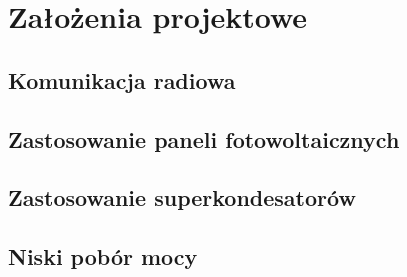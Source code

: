\chapter{Założenia projektowe}
\section{Komunikacja radiowa}
\section{Zastosowanie paneli fotowoltaicznych}
\section{Zastosowanie superkondesatorów}
\section{Niski pobór mocy}

